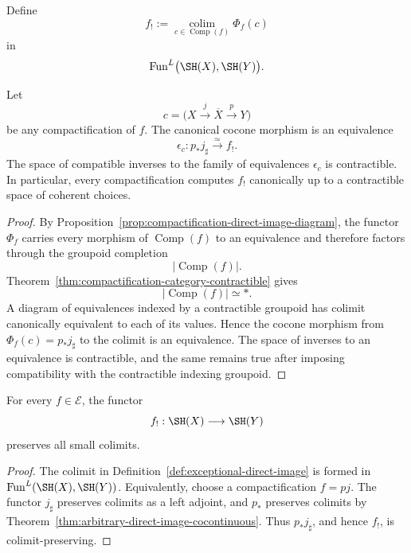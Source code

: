 \begin{definition}
\label{def:exceptional-direct-image}
Define
\[
    f_!
    :=
    \operatorname*{colim}_{c\in\operatorname{Comp}(f)}
    \Phi_f(c)
\]
in
\[
    \operatorname{Fun}^L
    \bigl(
      \SH(X),
      \SH(Y)
    \bigr).
\]
\end{definition}

\begin{theorem}
\label{thm:exceptional-evaluation-compactification}
Let
\[
    c=
    \bigl(
      X\xrightarrow{j}\overline X\xrightarrow{p}Y
    \bigr)
\]
be any compactification of \(f\).  The canonical cocone morphism is an
equivalence
\[
    \epsilon_c:
    p_*j_\sharp
    \xrightarrow{\simeq}
    f_!.
\]
The space of compatible inverses to the family of equivalences
\(\epsilon_c\) is contractible.  In particular, every compactification
computes \(f_!\) canonically up to a contractible space of coherent choices.
\end{theorem}

\begin{proof}
By Proposition~\ref{prop:compactification-direct-image-diagram}, the functor
\(\Phi_f\) carries every morphism of \(\operatorname{Comp}(f)\) to an
equivalence and therefore factors through the groupoid completion
\[
    \bigl|\operatorname{Comp}(f)\bigr|.
\]
Theorem~\ref{thm:compactification-category-contractible} gives
\[
    \bigl|\operatorname{Comp}(f)\bigr|
    \simeq
    *.
\]
A diagram of equivalences indexed by a contractible groupoid has colimit
canonically equivalent to each of its values.  Hence the cocone morphism
from \(\Phi_f(c)=p_*j_\sharp\) to the colimit is an equivalence.  The space
of inverses to an equivalence is contractible, and the same remains true
after imposing compatibility with the contractible indexing groupoid.
\end{proof}

\begin{corollary}[Cocontinuity]
\label{cor:exceptional-direct-image-cocontinuous}
For every \(f\in\mathcal E\), the functor
\[
    f_!:\SH(X)\longrightarrow\SH(Y)
\]
preserves all small colimits.
\end{corollary}

\begin{proof}
The colimit in Definition~\ref{def:exceptional-direct-image} is formed in
\(\operatorname{Fun}^L(\SH(X),\SH(Y))\).  Equivalently, choose a
compactification \(f=pj\).  The functor \(j_\sharp\) preserves colimits as a
left adjoint, and \(p_*\) preserves colimits by
Theorem~\ref{thm:arbitrary-direct-image-cocontinuous}.  Thus
\(p_*j_\sharp\), and hence \(f_!\), is colimit-preserving.
\end{proof}

